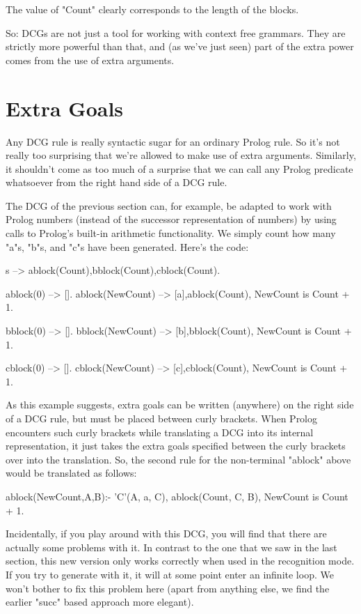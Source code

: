 The value of "Count" clearly corresponds to the
length of the blocks.

 So: DCGs are not just a tool for working with context free
grammars. They are strictly more powerful than that, and (as we've
just seen) part of the extra power comes from the use of extra
arguments.

\section{Extra Goals}\label{SEC.L8.TESTS}



Any DCG rule is really syntactic sugar for an ordinary Prolog rule.
So it's not really too surprising that we're allowed to make use of
extra arguments.  Similarly, it shouldn't come as too much of a
surprise that we can call any Prolog predicate whatsoever from the
right hand side of a DCG rule.

The DCG of the previous section can, for example, be adapted to work
with Prolog numbers (instead of the successor representation of
numbers) by using calls to Prolog's built-in arithmetic
functionality. We simply count how many "a"s, "b"s, and "c"s have been
generated. Here's the code:
\begin{LPNcodedisplay}
s --> ablock(Count),bblock(Count),cblock(Count).

ablock(0) --> [].
ablock(NewCount) --> [a],ablock(Count),
                     {NewCount is Count + 1}.

bblock(0) --> [].
bblock(NewCount) --> [b],bblock(Count),
                     {NewCount is Count + 1}.

cblock(0) --> [].
cblock(NewCount) --> [c],cblock(Count),
                     {NewCount is Count + 1}.
\end{LPNcodedisplay}

As this example suggests, extra goals can be written (anywhere) on the
right side of a DCG rule, but must be placed between curly
brackets. When Prolog encounters such curly brackets while translating
a DCG into its internal representation, it just takes the extra goals
specified between the curly brackets over into the translation. So,
the second rule for the non-terminal "ablock" above would be
translated as follows:
\begin{LPNcodedisplay}
ablock(NewCount,A,B):-
   'C'(A, a, C),
   ablock(Count, C, B),
   NewCount is Count + 1.
\end{LPNcodedisplay}


Incidentally, if you play around with this DCG, you will find that
there are actually some problems with it. In contrast to the one that
we saw in the last section, this new version only works correctly when
used in the recognition mode. If you try to generate with it, it will
at some point enter an infinite loop. We won't bother to fix this
problem here (apart from anything else, we find the earlier "succ"
based approach more elegant).

